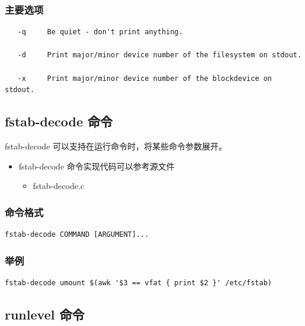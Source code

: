 \subsubsection{主要选项}

{\begin{shaded}\begin{verbatim}
   -q     Be quiet - don't print anything.

   -d     Print major/minor device number of the filesystem on stdout.

   -x     Print major/minor device number of the blockdevice on stdout.
\end{verbatim}\end{shaded}}
\subsection{fstab-decode 命令}

fstab-decode 可以支持在运行命令时，将某些命令参数展开。

\begin{itemize}
\item
  fstab-decode 命令实现代码可以参考源文件
  \begin{itemize}
  \item
    fstab-decode.c
  \end{itemize}
\end{itemize}
\subsubsection{命令格式}

{\begin{shaded}\begin{verbatim}
fstab-decode COMMAND [ARGUMENT]...
\end{verbatim}\end{shaded}}
\subsubsection{举例}

{\begin{shaded}\begin{verbatim}
fstab-decode umount $(awk '$3 == vfat { print $2 }' /etc/fstab)
\end{verbatim}\end{shaded}}
\subsection{runlevel 命令}

